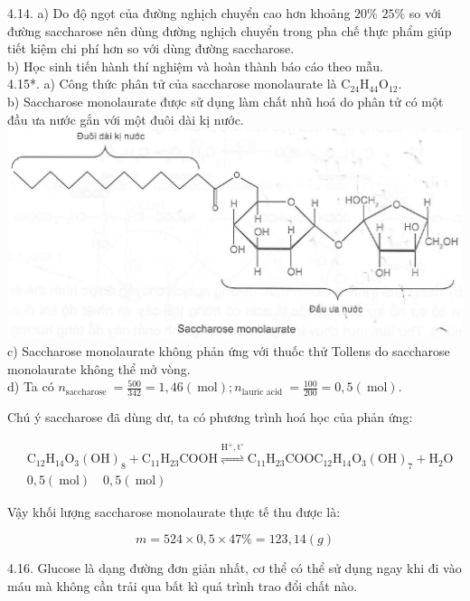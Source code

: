 \documentclass[10pt]{article}
\begin{document}
4.14. a) Do độ ngọt của đường nghịch chuyển cao hơn khoảng $20 \%$ $25 \%$ so với đường saccharose nên dùng đường nghịch chuyển trong pha chế thực phẩm giúp tiết kiệm chi phí hơn so với dùng đường saccharose.\\
b) Học sinh tiến hành thí nghiệm và hoàn thành báo cáo theo mẫu.\\
4.15*. a) Công thức phân tử của saccharose monolaurate là $\mathrm{C}_{24} \mathrm{H}_{44} \mathrm{O}_{12}$.\\
b) Saccharose monolaurate được sử dụng làm chất nhũ hoá do phân tử có một đầu ưa nước gắn với một đuôi dài kị nước.\\
\includegraphics[max width=\textwidth, center]{2025_10_23_b4e16b74380d0f7e7700g-031}\\
c) Saccharose monolaurate không phản ứng với thuốc thử Tollens do saccharose monolaurate không thể mở vòng.\\
d) Ta có $n_{\text {saccharose }}=\frac{500}{342}=1,46(\mathrm{~mol}) ; n_{\text {lauric acid }}=\frac{100}{200}=0,5(\mathrm{~mol})$.

Chú ý saccharose đã dùng dư, ta có phương trình hoá học của phản ứng:

$$
\begin{aligned}
& \mathrm{C}_{12} \mathrm{H}_{14} \mathrm{O}_{3}(\mathrm{OH})_{8}+\mathrm{C}_{11} \mathrm{H}_{23} \mathrm{COOH} \stackrel{\mathrm{H}^{+}, \mathrm{t}^{\circ}}{\rightleftharpoons} \mathrm{C}_{11} \mathrm{H}_{23} \mathrm{COOC}_{12} \mathrm{H}_{14} \mathrm{O}_{3}(\mathrm{OH})_{7}+\mathrm{H}_{2} \mathrm{O} \\
& 0,5(\mathrm{~mol}) \quad 0,5(\mathrm{~mol})
\end{aligned}
$$

Vậy khối lượng saccharose monolaurate thực tế thu được là:

$$
m=524 \times 0,5 \times 47 \%=123,14(g)
$$

4.16. Glucose là dạng đường đơn giản nhất, cơ thể có thể sử dụng ngay khi đi vào máu mà không cần trải qua bất kì quá trình trao đổi chất nào.
\end{document}
